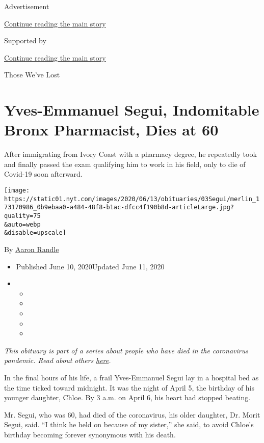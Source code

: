 Advertisement

\protect\hyperlink{after-top}{Continue reading the main story}

Supported by

\protect\hyperlink{after-sponsor}{Continue reading the main story}

Those We've Lost

\hypertarget{yves-emmanuel-segui-indomitable-bronx-pharmacist-dies-at-60}{%
\section{Yves-Emmanuel Segui, Indomitable Bronx Pharmacist, Dies at
60}\label{yves-emmanuel-segui-indomitable-bronx-pharmacist-dies-at-60}}

After immigrating from Ivory Coast with a pharmacy degree, he repeatedly
took and finally passed the exam qualifying him to work in his field,
only to die of Covid-19 soon afterward.

\texttt{[image: https://static01.nyt.com/images/2020/06/13/obituaries/03Segui/merlin\_173170986\_0b9ebaa0-a484-48f8-b1ac-dfcc4f190b8d-articleLarge.jpg?quality=75\\\&auto=webp\\\&disable=upscale]}

By \href{https://www.nytimes.com/by/aaron-randle}{Aaron Randle}

\begin{itemize}
\item
  Published June 10, 2020Updated June 11, 2020
\item
  \begin{itemize}
  \item
  \item
  \item
  \item
  \item
  \end{itemize}
\end{itemize}

\emph{This obituary is part of a series about people who have died in
the coronavirus pandemic. Read about others}
\href{https://www.nytimes.com/interactive/2020/obituaries/people-died-coronavirus-obituaries.html}{\emph{here}}\emph{.}

In the final hours of his life, a frail Yves-Emmanuel Segui lay in a
hospital bed as the time ticked toward midnight. It was the night of
April 5, the birthday of his younger daughter, Chloe. By 3 a.m. on April
6, his heart had stopped beating.

Mr. Segui, who was 60, had died of the coronavirus, his older daughter,
Dr. Morit Segui, said. ``I think he held on because of my sister,'' she
said, to avoid Chloe's birthday becoming forever synonymous with his
death.

